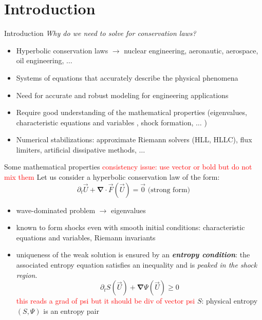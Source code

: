 \documentclass[xcolor=dvipsnames,10pt]{beamer}
\renewcommand{\div}{\boldsymbol{\nabla}\! \cdot \!}
\newcommand{\grad}{\boldsymbol{\nabla}}
\newcommand{\tcr}[1]{\textcolor{red}{#1}}
\begin{document}
\section{Introduction}
\begin{frame}{Introduction}
\emph{Why do we need to solve for conservation laws?}
\begin{block}{}
\begin{itemize}
\setlength{\itemsep}{10pt}
\item Hyperbolic conservation laws $\longrightarrow$ nuclear engineering, aeronautic, aerospace, oil engineering, $\dots$
\item Systems of equations that accurately describe the physical phenomena
\item Need for accurate and robust modeling for engineering applications
\item Require good understanding of the mathematical properties (eigenvalues, characteristic equations and variables , shock formation, $\dots$ )
\item Numerical stabilizations: approximate Riemann solvers (HLL, HLLC), flux limiters, artificial dissipative methods, $\dots$
\end{itemize}
\end{block}
\end{frame}
\begin{frame}{Some mathematical properties}
\tcr{consistency issue: use vector or bold but do not mix them}
Let us consider a hyperbolic conservation law of the form:
\begin{equation} \partial_t \vec{U} + \div \vec{F} ( \vec{U} ) = \vec{0}  \nonumber \text{ (strong form)}\end{equation} 
\begin{itemize}
\item wave-dominated problem $\to$ eigenvalues
\item known to form shocks even with smooth initial conditions: characteristic equations and variables, Riemann invariants
\item uniqueness of the weak solution is ensured by an \textbf{\emph{entropy condition}}: the associated entropy equation satisfies an inequality and is \emph{peaked in the shock region}.
\begin{equation}
\partial_t S ( \vec{U} ) + \grad \Psi ( \vec{U} ) \geq 0  \nonumber
\end{equation}
\tcr{this reads a grad of psi but it should be div of vector psi}
$S$: physical entropy \\
$\left( S, \Psi \right)$ is an entropy pair
\end{itemize}
\end{frame}
\end{document}

